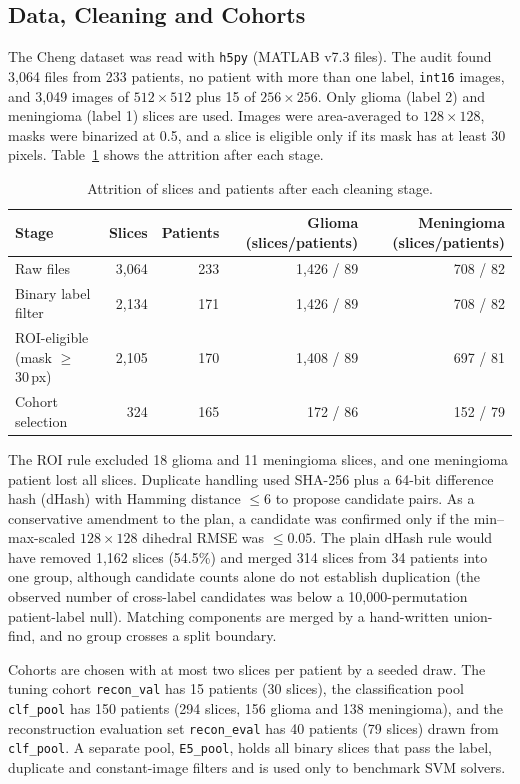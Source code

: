 \documentclass[conference,a4paper]{IEEEtran}
\begin{document}
\subsection{Data, Cleaning and Cohorts}
The Cheng dataset was read with \texttt{h5py} (MATLAB v7.3 files). The audit found 3{,}064 files from 233 patients, no patient with more than one label, \texttt{int16} images, and 3{,}049 images of $512\times512$ plus 15 of $256\times256$. Only glioma (label 2) and meningioma (label 1) slices are used. Images were area-averaged to $128\times128$, masks were binarized at 0.5, and a slice is eligible only if its mask has at least 30 pixels. Table~\ref{tab:attrition} shows the attrition after each stage.

\begin{table}[!tb]
\centering
\caption{Attrition of slices and patients after each cleaning stage.}
\label{tab:attrition}
\footnotesize
\begin{tabular}{@{}lrrrr@{}}
\toprule
Stage & Slices & Patients & Glioma (slices/patients) & Meningioma (slices/patients)\\
\midrule
Raw files & 3{,}064 & 233 & 1{,}426 / 89 & 708 / 82\\
Binary label filter & 2{,}134 & 171 & 1{,}426 / 89 & 708 / 82\\
ROI-eligible (mask $\ge$ 30\,px) & 2{,}105 & 170 & 1{,}408 / 89 & 697 / 81\\
Cohort selection & 324 & 165 & 172 / 86 & 152 / 79\\
\bottomrule
\end{tabular}
\end{table}

The ROI rule excluded 18 glioma and 11 meningioma slices, and one meningioma patient lost all slices. Duplicate handling used SHA-256 plus a 64-bit difference hash (dHash) with Hamming distance $\le6$ to propose candidate pairs. As a conservative amendment to the plan, a candidate was confirmed only if the min--max-scaled $128\times128$ dihedral RMSE was $\le0.05$. The plain dHash rule would have removed 1{,}162 slices (54.5\%) and merged 314 slices from 34 patients into one group, although candidate counts alone do not establish duplication (the observed number of cross-label candidates was below a 10{,}000-permutation patient-label null). Matching components are merged by a hand-written union-find, and no group crosses a split boundary.

Cohorts are chosen with at most two slices per patient by a seeded draw. The tuning cohort \texttt{recon\_val} has 15 patients (30 slices), the classification pool \texttt{clf\_pool} has 150 patients (294 slices, 156 glioma and 138 meningioma), and the reconstruction evaluation set \texttt{recon\_eval} has 40 patients (79 slices) drawn from \texttt{clf\_pool}. A separate pool, \texttt{E5\_pool}, holds all binary slices that pass the label, duplicate and constant-image filters and is used only to benchmark SVM solvers.
\end{document}
